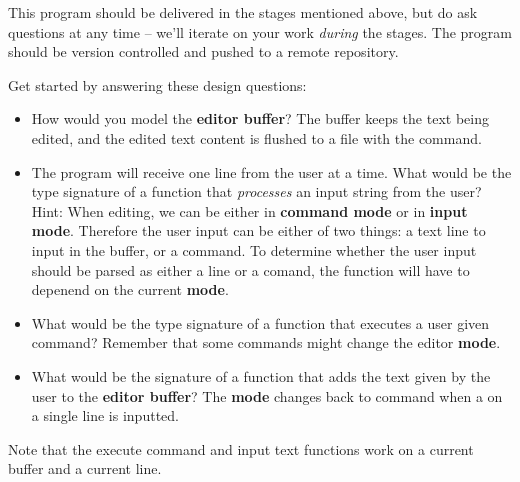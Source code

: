 \documentclass[a4paper,10pt]{article}
\begin{document}
This program should be delivered in the stages mentioned above, but do
ask questions at any time -- we'll iterate on your work \emph{during} the stages.
The program should be version controlled and pushed to a remote repository.

Get started by answering these design questions:

\begin{itemize}
    \item How would you model the \textbf{editor buffer}? The buffer keeps the text being
    edited, and the edited text content is flushed to a file with the  command.

    \item The program will receive one line from the user at a time. What would be the
    type signature of a function that \emph{processes} an input string from the
    user? Hint: When editing, we can be either in \textbf{command mode} or in
    \textbf{input mode}. Therefore the user input can be either of two things: a
    text line to input in the buffer, or a command. To determine whether the user
    input should be parsed as either a line or a comand, the function will have to
    depenend on the current \textbf{mode}.

    \item What would be the type signature of a function that executes a user
    given command? Remember that some commands might change the editor \textbf{mode}.

    \item What would be the signature of a function that adds the text given by the user
    to the \textbf{editor buffer}? The \textbf{mode} changes back to command when a
     on a single line is inputted.
\end{itemize}

Note that the execute command and input text functions work on a current buffer and a current line.
\end{document}
